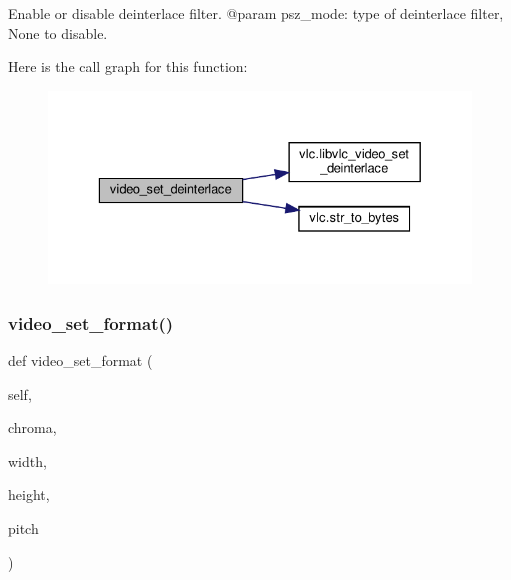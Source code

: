 \begin{DoxyVerb}Enable or disable deinterlace filter.
@param psz_mode: type of deinterlace filter, None to disable.
\end{DoxyVerb}
 Here is the call graph for this function\+:
\nopagebreak
\begin{figure}[H]
\begin{center}
\leavevmode
\includegraphics[width=329pt]{classvlc_1_1_media_player_a7e7401a9ec141adb28bd0c1f5c53f6f6_cgraph}
\end{center}
\end{figure}
\mbox{\label{classvlc_1_1_media_player_aaa29bcd8c914e465dea43f8fc19fade4}} 
\subsubsection{\texorpdfstring{video\+\_\+set\+\_\+format()}{video\_set\_format()}}
{\footnotesize\ttfamily def video\+\_\+set\+\_\+format (\begin{DoxyParamCaption}\item[{}]{self,  }\item[{}]{chroma,  }\item[{}]{width,  }\item[{}]{height,  }\item[{}]{pitch }\end{DoxyParamCaption})}

